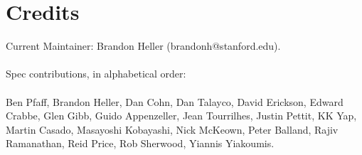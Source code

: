 \section{Credits}

Current Maintainer: Brandon Heller (brandonh@stanford.edu).
\\\\
Spec contributions, in alphabetical order:
\\\\
Ben Pfaff,
Brandon Heller,
Dan Cohn,
Dan Talayco,
David Erickson,
Edward Crabbe,
Glen Gibb,
Guido Appenzeller,
Jean Tourrilhes,
Justin Pettit,
KK Yap,
Martin Casado,
Masayoshi Kobayashi,
Nick McKeown,
Peter Balland,
Rajiv Ramanathan,
Reid Price,
Rob Sherwood,
Yiannis Yiakoumis.
